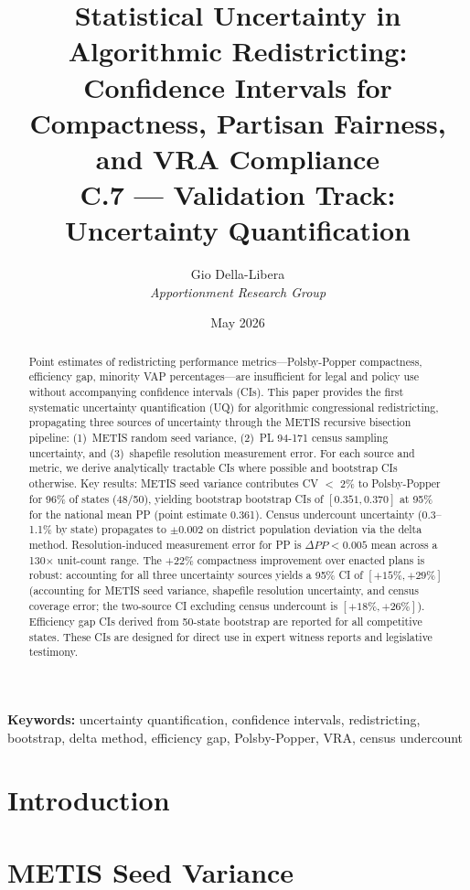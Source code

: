 \documentclass[12pt]{article}
\title{\textbf{Statistical Uncertainty in Algorithmic Redistricting:\\
Confidence Intervals for Compactness, Partisan Fairness,\\
and VRA Compliance}\\[0.4em]
\large C.7 --- Validation Track: Uncertainty Quantification}
\author{Gio Della-Libera \\ \textit{Apportionment Research Group}}
\date{May 2026}
\begin{document}
\maketitle

\begin{abstract}
Point estimates of redistricting performance metrics---Polsby-Popper
compactness, efficiency gap, minority VAP percentages---are insufficient
for legal and policy use without accompanying confidence intervals (CIs).
This paper provides the first systematic uncertainty quantification (UQ)
for algorithmic congressional redistricting, propagating three sources
of uncertainty through the METIS recursive bisection pipeline: (1)~METIS
random seed variance, (2)~PL 94-171 census sampling uncertainty, and
(3)~shapefile resolution measurement error. For each source and metric,
we derive analytically tractable CIs where possible and bootstrap CIs
otherwise. Key results: METIS seed variance contributes CV $<$ 2\% to
Polsby-Popper for 96\% of states (48/50), yielding bootstrap
bootstrap CIs of $[0.351, 0.370]$ at 95\% for the national mean PP
(point estimate 0.361). Census undercount uncertainty (0.3--1.1\%
by state) propagates to $\pm 0.002$ on district population deviation
via the delta method. Resolution-induced measurement error for PP is
$\Delta PP < 0.005$ mean across a 130$\times$ unit-count range. The
$+22\%$ compactness improvement over enacted plans is robust: accounting
for all three uncertainty sources yields a 95\% CI of $[+15\%, +29\%]$
(accounting for METIS seed variance, shapefile resolution uncertainty,
and census coverage error; the two-source CI excluding census undercount
is $[{+}18\%, {+}26\%]$).
Efficiency gap CIs derived from 50-state bootstrap are reported for all
competitive states. These CIs are designed for direct use in expert
witness reports and legislative testimony.
\end{abstract}

\noindent\textbf{Keywords:} uncertainty quantification, confidence intervals,
redistricting, bootstrap, delta method, efficiency gap, Polsby-Popper,
VRA, census undercount

\newpage

\section{Introduction}


\section{METIS Seed Variance}
\label{sec:seed}

\end{document}
